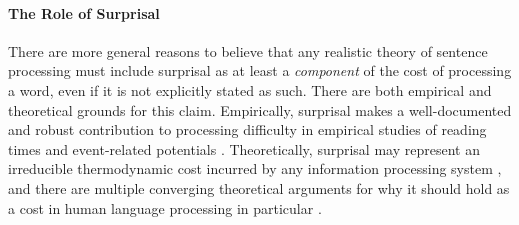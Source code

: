 

\paragraph{The Role of Surprisal}

There are more general reasons to believe that any realistic theory of sentence processing must include surprisal as at least a \emph{component} of the cost of processing a word, even if it is not explicitly stated as such. 
There are both empirical and theoretical grounds for this claim.
Empirically, surprisal makes a well-documented and robust contribution to processing difficulty in empirical studies of reading times and event-related potentials \citep{smith2013effect,frank2015erp}. 
Theoretically, surprisal may represent an irreducible thermodynamic cost incurred by any information processing system \citep{landauer1961irreversibility,still2012thermodynamic,zenon2019information}, and there are multiple converging theoretical arguments for why it should hold as a cost in human language processing in particular \cite[see][for a review]{levy2013memory}. 



